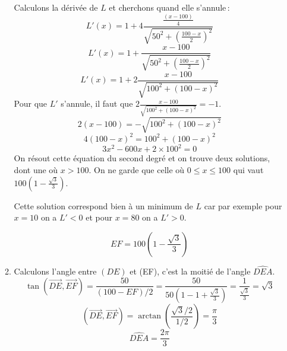 \documentclass[10pt,a4paper]{article}
\begin{document}
\begin{enumerate}
\begin{enumerate}
Calculons la dérivée de $L$ et cherchons quand elle s'annule\,:
$$L'(x)=1+4\frac{\frac{(x-100)}{4}}{\sqrt{50^2+(\frac{100-x}{2})^2}}$$
$$L'(x)=1+\frac{x-100}{\sqrt{50^2+(\frac{100-x}{2})^2}}$$
$$L'(x)=1+2\frac{x-100}{\sqrt{100^2+(100-x)^2}}$$
Pour que $L'$ s'annule, il faut que $2\frac{x-100}{\sqrt{100^2+(100-x)^2}}=-1$.
$$2(x-100)=-\sqrt{100^2+(100-x)^2}$$
$$4(100-x)^2=100^2+(100-x)^2$$
$$3x^2-600x+2\times 100^2=0$$
On résout cette équation du second degré et on trouve deux solutions, dont une où $x>100$. On ne garde que celle où $0\leqslant x \leqslant 100$ qui vaut 
$100(1-\frac{\sqrt{3}}{3})$.

Cette solution correspond bien à un minimum de $L$ car par exemple pour $x=10$ on a $L'<0$ et pour $x=80$ on a $L'>0$.

$$\boxed{EF=100(1-\frac{\sqrt{3}}{3})}$$ 
\item Calculons l'angle entre $(DE)$ et (EF), c'est la moitié de l'angle $\widehat{DEA}$.
$$\tan(\overrightarrow{DE},\overrightarrow{EF})=\frac{50}{(100-EF)/2}=\frac{50}{50(1-1+\frac{\sqrt{3}}{3})}=\frac{1}{\frac{\sqrt{3}}{3}}=\sqrt{3}$$
$$(\overrightarrow{DE},\overrightarrow{EF})=\arctan(\frac{\sqrt{3}/2}{1/2})=\frac{\pi}{3}$$
$$\boxed{\widehat{DEA}=\frac{2\pi}{3}}$$
\end{enumerate}
\end{enumerate}
\end{document}
